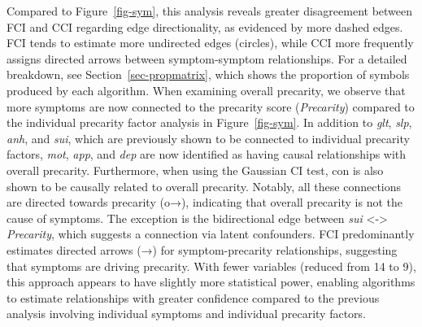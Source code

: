 \documentclass[
]{article}
\begin{document}
Compared to Figure~\ref{fig-sym}, this analysis reveals greater
disagreement between FCI and CCI regarding edge directionality, as
evidenced by more dashed edges. FCI tends to estimate more undirected
edges (circles), while CCI more frequently assigns directed arrows
between symptom-symptom relationships. For a detailed breakdown, see
Section~\ref{sec-propmatrix}, which shows the proportion of symbols
produced by each algorithm. When examining overall precarity, we observe
that more symptoms are now connected to the precarity score
(\emph{Precarity}) compared to the individual precarity factor analysis
in Figure~\ref{fig-sym}. In addition to \emph{glt}, \emph{slp},
\emph{anh}, and \emph{sui}, which are previously shown to be connected
to individual precarity factors, \emph{mot}, \emph{app}, and \emph{dep}
are now identified as having causal relationships with overall
precarity. Furthermore, when using the Gaussian CI test, con is also
shown to be causally related to overall precarity. Notably, all these
connections are directed towards precarity (o→), indicating that overall
precarity is not the cause of symptoms. The exception is the
bidirectional edge between \emph{sui} \textless-\textgreater{}
\emph{Precarity}, which suggests a connection via latent confounders.
FCI predominantly estimates directed arrows (→) for symptom-precarity
relationships, suggesting that symptoms are driving precarity. With
fewer variables (reduced from 14 to 9), this approach appears to have
slightly more statistical power, enabling algorithms to estimate
relationships with greater confidence compared to the previous analysis
involving individual symptoms and individual precarity factors.
\end{document}
